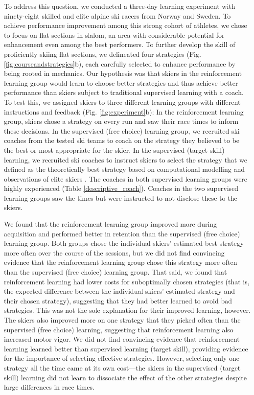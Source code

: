 \documentclass[pdflatex,sn-mathphys-num]{sn-jnl}%
\theoremstyle{thmstyleone}%
\theoremstyle{thmstyletwo}%
\theoremstyle{thmstylethree}%
\begin{document}
To address this question, we conducted a three-day learning experiment with ninety-eight skilled and elite alpine ski racers from Norway and Sweden. To achieve performance improvement among this strong cohort of athletes, we chose to focus on flat sections in slalom, an area with considerable potential for enhancement even among the best performers\cite{supej_new_2011}. To further develop the skill of proficiently skiing flat sections, we delineated four strategies (Fig. \ref{fig:courseandstrategies}b), each carefully selected to enhance performance by being rooted in mechanics. Our hypothesis was that skiers in the reinforcement learning group would learn to choose better strategies and thus achieve better performance than skiers subject to traditional supervised learning with a coach. To test this, we assigned skiers to three different learning groups with different instructions and feedback (Fig. \ref{fig:experiment}b): In the reinforcement learning group, skiers chose a strategy on every run and saw their race times to inform these decisions. In the supervised (free choice) learning group, we recruited ski coaches from the tested ski teams to coach on the strategy they believed to be the best or most appropriate for the skier. In the supervised (target skill) learning, we recruited ski coaches to instruct skiers to select the strategy that we defined as the theoretically best strategy based on computational modelling \cite{lind_physics_2013, mote_accelerations_1983, luginbuhl_identification_2023} and observations of elite skiers \cite{reid_alpine_2020, magelssen_is_2022}. The coaches in both supervised learning groups were highly experienced (Table \ref{descriptive_coach}). Coaches in the two supervised learning groups saw the times but were instructed to not disclose these to the skiers. 

We found that the reinforcement learning group improved more during acquisition and performed better in retention than the supervised (free choice) learning group. Both groups chose the individual skiers' estimated best strategy more often over the course of the sessions, but we did not find convincing evidence that the reinforcement learning group chose this strategy more often than the supervised (free choice) learning group. That said, we found that reinforcement learning had lower costs for suboptimally chosen strategies (that is, the expected difference between the individual skiers' estimated strategy and their chosen strategy), suggesting that they had better learned to avoid bad strategies. This was not the sole explanation for their improved learning, however. The skiers also improved more on one strategy that they picked often than the supervised (free choice) learning, suggesting that reinforcement learning also increased motor vigor. We did not find convincing evidence that reinforcement learning learned better than supervised learning (target skill), providing evidence for the importance of selecting effective strategies.  However, selecting only one strategy all the time came at its own cost—the skiers in the supervised (target skill) learning did not learn to dissociate the effect of the other strategies despite large differences in race times. 
\end{document}
